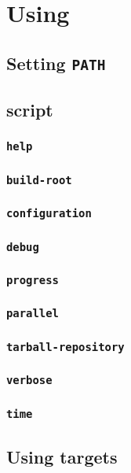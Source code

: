 \chapter{Using \lmsbw}

\section{Setting \texttt{PATH}}
\section{\lmsbw script}
\subsection{\texttt{help}}
\subsection{\texttt{build-root}}
\subsection{\texttt{configuration}}
\subsection{\texttt{debug}}
\subsection{\texttt{progress}}
\subsection{\texttt{parallel}}
\subsection{\texttt{tarball-repository}}
\subsection{\texttt{verbose}}
\subsection{\texttt{time}}

\section{Using \lmsbw \make targets}
